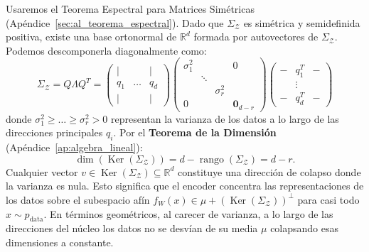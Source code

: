  Usaremos el Teorema Espectral para Matrices Simétricas (Apéndice~\ref{sec:al_teorema_espectral}). Dado que $\Sigma_\mathcal{Z}$ es simétrica y semidefinida positiva, existe una base ortonormal de $\mathbb{R}^d$ formada por autovectores de $\Sigma_\mathcal{Z}$. Podemos descomponerla diagonalmente como:
\begin{equation}
    \Sigma_\mathcal{Z} = Q \Lambda Q^T = 
    \begin{pmatrix}
        | & & | \\
        q_1 & \dots & q_d \\
        | & & |
    \end{pmatrix}
    \begin{pmatrix}
        \sigma_1^2 & & & 0 \\
        & \ddots & & \\
        & & \sigma_r^2 & \\
        0 & & & \mathbf{0}_{d-r}
    \end{pmatrix}
    \begin{pmatrix}
        - & q_1^T & - \\
          & \vdots &   \\
        - & q_d^T & -
    \end{pmatrix}
\end{equation}
donde $\sigma_1^2 \ge \dots \ge \sigma_r^2 > 0$ representan la varianza de los datos a lo largo de las direcciones principales $q_i$. Por el \textbf{Teorema de la Dimensión} (Apéndice~\ref{ap:algebra_lineal}):
\begin{equation}
    \dim(\operatorname{Ker}(\Sigma_\mathcal{Z})) = d - \operatorname{rango}(\Sigma_\mathcal{Z}) = d - r.
\end{equation}
Cualquier vector $v \in \operatorname{Ker}(\Sigma_\mathcal{Z}) \subseteq \mathbb{R}^d$ constituye una dirección de colapso donde la varianza es nula. Esto significa que el encoder concentra las representaciones de los datos sobre el subespacio afín $f_W(x) \in \mu + (\operatorname{Ker}(\Sigma_\mathcal{Z}))^\perp$ para casi todo $x \sim p_{\text{data}}.$ En términos geométricos, al carecer de varianza, a lo largo de las direcciones del núcleo los datos no se desvían de su media $\mu$ colapsando esas dimensiones a constante.


